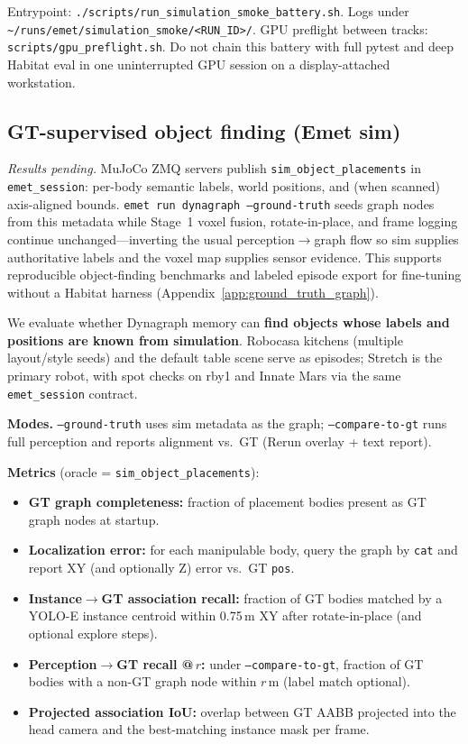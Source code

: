 Entrypoint: \texttt{./scripts/run\_simulation\_smoke\_battery.sh}. Logs under \texttt{\textasciitilde/runs/emet/simulation\_smoke/<RUN\_ID>/}. GPU preflight between tracks: \texttt{scripts/gpu\_preflight.sh}. Do not chain this battery with full pytest and deep Habitat eval in one uninterrupted GPU session on a display-attached workstation.

\subsection{GT-supervised object finding (Emet sim)}
\label{sec:gt_experiments}

\textit{Results pending.}
MuJoCo ZMQ servers publish \texttt{sim\_object\_placements} in \texttt{emet\_session}: per-body semantic labels, world positions, and (when scanned) axis-aligned bounds.
\texttt{emet run dynagraph --ground-truth} seeds graph nodes from this metadata while Stage~1 voxel fusion, rotate-in-place, and frame logging continue unchanged---inverting the usual perception$\rightarrow$graph flow so sim supplies authoritative labels and the voxel map supplies sensor evidence.
This supports reproducible object-finding benchmarks and labeled episode export for fine-tuning without a Habitat harness (Appendix~\ref{app:ground_truth_graph}).

We evaluate whether Dynagraph memory can \textbf{find objects whose labels and positions are known from simulation}.
Robocasa kitchens (multiple layout/style seeds) and the default table scene serve as episodes; Stretch is the primary robot, with spot checks on rby1 and Innate Mars via the same \texttt{emet\_session} contract.

\textbf{Modes.}
\texttt{--ground-truth} uses sim metadata as the graph; \texttt{--compare-to-gt} runs full perception and reports alignment vs.\ GT (Rerun overlay + text report).

\textbf{Metrics} (oracle = \texttt{sim\_object\_placements}):
\begin{itemize}
  \item \textbf{GT graph completeness:} fraction of placement bodies present as GT graph nodes at startup.
  \item \textbf{Localization error:} for each manipulable body, query the graph by \texttt{cat} and report XY (and optionally Z) error vs.\ GT \texttt{pos}.
  \item \textbf{Instance$\rightarrow$GT association recall:} fraction of GT bodies matched by a YOLO-E instance centroid within 0.75\,m XY after rotate-in-place (and optional explore steps).
  \item \textbf{Perception$\rightarrow$GT recall @\,$r$:} under \texttt{--compare-to-gt}, fraction of GT bodies with a non-GT graph node within $r$\,m (label match optional).
  \item \textbf{Projected association IoU:} overlap between GT AABB projected into the head camera and the best-matching instance mask per frame.
\end{itemize}

